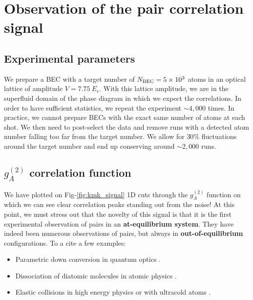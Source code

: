 \section{Observation of the pair correlation signal}

\subsection{Experimental parameters}

We prepare a BEC with a target number of $N_{\rm{BEC}}=5 \times 10^3$ atoms in an optical lattice of amplitude $V=7.75 \ E_r$. With this lattice amplitude, we are in the superfluid domain of the phase diagram in which we expect the \kmk correlations. In order to have sufficient statistics, we repeat the experiment $\sim 4,000$ times. In practice, we cannot prepare BECs with the exact same number of atoms at each shot. We then need to post-select the data and remove runs with a detected atom number falling too far from the target number. We allow for $30 \%$ fluctuations around the target number and end up conserving around $\sim 2,000$ runs.

\subsection{$g^{(2)}_A$ correlation function}

We have plotted on Fig-\ref{fig:kmk_signal} 1D cuts through the $g_{A}^{(2)}$ function on which we can see clear correlation peaks standing out from the noise! At this point, we must stress out that the novelty of this signal is that it is the first experimental observation of \kmk pairs in an \textbf{at-equilibrium system}. They have indeed been numerous observations of \kmk pairs, but always in \textbf{out-of-equilibrium} configurations. To a cite a few examples:

\begin{itemize}
    \item Parametric down conversion in quantum optics \cite{burnham1970}.
    \item Dissociation of diatomic molecules in atomic physics \cite{greiner2005}.
    \item Elastic collisions in high energy physics \cite{arnison1982} or with ultracold atoms \cite{perrin2007observation}.
\end{itemize}


